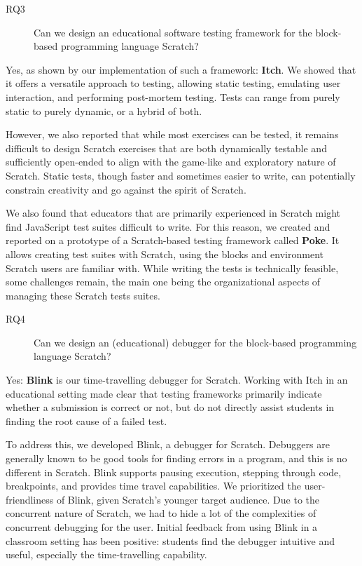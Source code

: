 \documentclass[main]{subfiles}
\begin{document}
\begin{description}
    \item[RQ3] Can we design an educational software testing framework for the block-based programming language Scratch?
\end{description}

Yes, as shown by our implementation of such a framework: \textbf{Itch}.
We showed that it offers a versatile approach to testing, allowing static testing, emulating user interaction, and performing post-mortem testing.
Tests can range from purely static to purely dynamic, or a hybrid of both.

However, we also reported that while most exercises can be tested, it remains difficult to design Scratch exercises that are both dynamically testable and sufficiently open-ended to align with the game-like and exploratory nature of Scratch.
Static tests, though faster and sometimes easier to write, can potentially constrain creativity and go against the spirit of Scratch.

We also found that educators that are primarily experienced in Scratch might find JavaScript test suites difficult to write.
For this reason, we created and reported on a prototype of a Scratch-based testing framework called \textbf{Poke}.
It allows creating test suites with Scratch, using the blocks and environment Scratch users are familiar with.
While writing the tests is technically feasible, some challenges remain, the main one being the organizational aspects of managing these Scratch tests suites.

\begin{description}
    \item[RQ4] Can we design an (educational) debugger for the block-based programming language Scratch?
\end{description}

Yes: \textbf{Blink} is our time-travelling debugger for Scratch.
Working with Itch in an educational setting made clear that testing frameworks primarily indicate whether a submission is correct or not, but do not directly assist students in finding the root cause of a failed test.

To address this, we developed Blink, a debugger for Scratch.
Debuggers are generally known to be good tools for finding errors in a program, and this is no different in Scratch.
Blink supports pausing execution, stepping through code, breakpoints, and provides time travel capabilities.
We prioritized the user-friendliness of Blink, given Scratch's younger target audience.
Due to the concurrent nature of Scratch, we had to hide a lot of the complexities of concurrent debugging for the user.
Initial feedback from using Blink in a classroom setting has been positive: students find the debugger intuitive and useful, especially the time-travelling capability.
\end{document}
